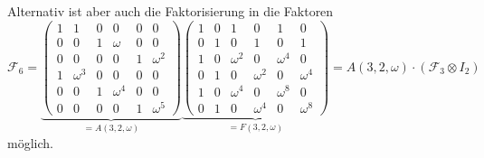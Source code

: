Alternativ ist aber auch die Faktorisierung in die Faktoren
\[
\mathscr{F}_6
=
\underbrace{
\left(\begin{array}{cc|cc|cc}
1&       1&0&       0&0&       0\\
0&       0&1&  \omega&0&       0\\
0&       0&0&       0&1&\omega^2\\
\hline
1&\omega^3&0&       0&0&       0\\
0&       0&1&\omega^4&0&       0\\
0&       0&0&       0&1&\omega^5
\end{array}\right)
}_{\displaystyle =A(3,2,\omega)}
\underbrace{
\left(\begin{array}{cc|cc|cc}
1&0&       1&       0&       1&       0\\
0&1&       0&       1&       0&       1\\
\hline
1&0&\omega^2&       0&\omega^4&       0\\
0&1&       0&\omega^2&       0&\omega^4\\
\hline
1&0&\omega^4&       0&\omega^8&       0\\
0&1&       0&\omega^4&       0&\omega^8
\end{array}\right)
}_{\displaystyle =F(3,2,\omega)}
=
A(3,2,\omega)  
\cdot
(\mathscr{F}_3\otimes I_2)
\]
möglich.

%
%
